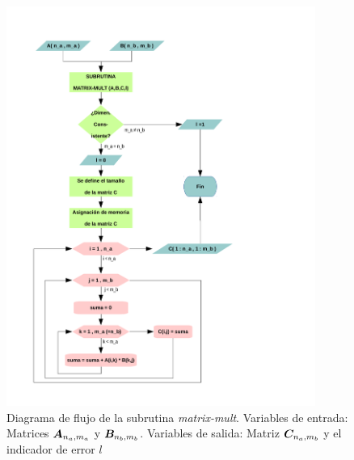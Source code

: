 \begin{figure} [H]
\begin{center}
\includegraphics[width=0.9\textwidth]{./parte2/graficos/diagrama_de_flujo.pdf}
\caption{Diagrama de flujo de la subrutina \textit{matrix-mult}. Variables de entrada: Matrices $\boldsymbol{A}_{n_a,m_a}$ y $\boldsymbol{B}_{n_b,m_b}$. Variables de salida: Matriz $\boldsymbol{C}_{n_a,m_b}$ y el indicador de error $l$} \label{fig_P1_3}
\end{center}
\end{figure}
